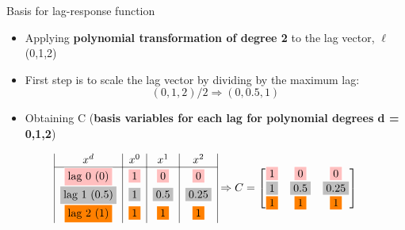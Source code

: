 \documentclass[english]{beamer}
\newcommand{\alertblue}[1]{{\color{blue}#1}}
\begin{document}
\begin{frame}{Basis for lag-response function}
    \begin{itemize}
        \item Applying \alertblue{\textbf{polynomial transformation of degree 2}} to the lag vector, \(\ell\)(0,1,2)
        \item First step is to scale the lag vector by dividing by the maximum lag:
        \[
        (0,1,2)/2 \Rightarrow (0, 0.5, 1)
        \]
        \item Obtaining \alertblue{C} (\alertblue{\textbf{basis variables for each lag for polynomial degrees d = 0,1,2}})
    \end{itemize}
    \vspace{0.5cm}
\[
\begin{array}{|c|c|c|c|}
    x^d & x^0 & x^1 & x^2 \\ \hline
    \fcolorbox{white}{pink}{lag 0 (0)} & \fcolorbox{white}{pink}{1}  & \fcolorbox{white}{pink}{0}   & \fcolorbox{white}{pink}{0}   \\
    \fcolorbox{white}{lightgray}{lag 1 (0.5)} & \fcolorbox{white}{lightgray}{1}  & \fcolorbox{white}{lightgray}{0.5} & \fcolorbox{white}{lightgray}{0.25} \\
    \fcolorbox{white}{orange}{lag 2 (1)} & \fcolorbox{white}{orange}{1}  & \fcolorbox{white}{orange}{1}   & \fcolorbox{white}{orange}{1}  
\end{array}
\Rightarrow C = 
\begin{bmatrix}
\fcolorbox{white}{pink}{1} & \fcolorbox{white}{pink}{0} & \fcolorbox{white}{pink}{0} \\
\fcolorbox{white}{lightgray}{1} & \fcolorbox{white}{lightgray}{0.5} & \fcolorbox{white}{lightgray}{0.25} \\
\fcolorbox{white}{orange}{1} & \fcolorbox{white}{orange}{1} & \fcolorbox{white}{orange}{1}
\end{bmatrix}
\]
\end{frame}
\end{document}
